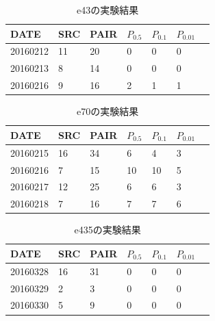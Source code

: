 \documentclass[twocolumn,10pt]{ltjsarticle}
\begin{document}
\begin{table}[htbp]
    \centering
    \caption{e43の実験結果}

    \begin{tabular}{C{13mm}||L{7mm}L{7mm}L{7mm}L{7mm}L{7mm}L{7mm}}
        \hline
        DATE & SRC & PAIR & ${P_{0.5}}$ & ${P_{0.1}}$ & ${P_{0.01}}$ \\
        \hline \hline
        20160212  & 11 & 20 & 0 & 0 & 0 \\
        20160213  & 8  & 14 & 0 & 0 & 0 \\
        20160216  & 9  & 16 & 2 & 1 & 1 \\
        \hline
    \end{tabular}
    \label{tab:e43}
\end{table}

\begin{table}[htbp]
    \centering
    \caption{e70の実験結果}

    \begin{tabular}{C{13mm}||L{7mm}L{7mm}L{7mm}L{7mm}L{7mm}L{7mm}}
        \hline
        DATE & SRC & PAIR & ${P_{0.5}}$ & ${P_{0.1}}$ & ${P_{0.01}}$ \\
        \hline \hline
        20160215  & 16 & 34 & 6  & 4  & 3 \\
        20160216  & 7  & 15 & 10 & 10 & 5 \\
        20160217  & 12 & 25 & 6  & 6  & 3 \\
        20160218  & 7  & 16 & 7  & 7  & 6 \\
        \hline
    \end{tabular}
    \label{tab:e70}
\end{table}

\begin{table}[htbp]
    \centering
    \caption{e435の実験結果}

    \begin{tabular}{C{13mm}||L{7mm}L{7mm}L{7mm}L{7mm}L{7mm}L{7mm}}
        \hline
        DATE & SRC & PAIR & ${P_{0.5}}$ & ${P_{0.1}}$ & ${P_{0.01}}$ \\
        \hline \hline
        20160328  & 16 & 31 & 0 & 0 & 0 \\
        20160329  & 2  & 3  & 0 & 0 & 0 \\
        20160330  & 5  & 9  & 0 & 0 & 0 \\
        \hline
    \end{tabular}
    \label{tab:e435}
\end{table}
\end{document}
